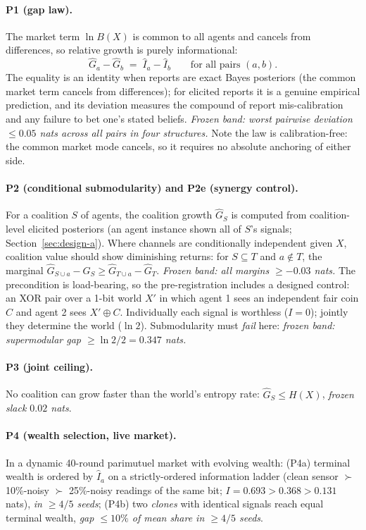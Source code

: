 \documentclass{article} %
\newcommand{\Ihat}{\hat{I}}
\newcommand{\Ghat}{\hat{G}}
\begin{document}
\paragraph{P1 (gap law).} The market term $\ln B(X)$ is common to all agents and cancels from differences, so relative growth is purely informational:
\begin{equation}
\Ghat_a - \Ghat_b \;=\; \Ihat_a - \Ihat_b \qquad \text{for all pairs } (a,b).
\label{eq:gaplaw}
\end{equation}
The equality is an identity when reports are exact Bayes posteriors (the common market term cancels from differences); for elicited reports it is a genuine empirical prediction, and its deviation measures the compound of report mis-calibration and any failure to bet one's stated beliefs. \emph{Frozen band: worst pairwise deviation $\leq 0.05$ nats across all pairs in four structures.} Note the law is calibration-free: the common market mode cancels, so it requires no absolute anchoring of either side.

\paragraph{P2 (conditional submodularity) and P2e (synergy control).} For a coalition $S$ of agents, the coalition growth $\Ghat_S$ is computed from coalition-level elicited posteriors (an agent instance shown all of $S$'s signals; Section~\ref{sec:design-a}). Where channels are conditionally independent given $X$, coalition value should show diminishing returns: for $S \subseteq T$ and $a \notin T$, the marginal $\Ghat_{S \cup a} - \Ghat_S \geq \Ghat_{T\cup a} - \Ghat_T$. \emph{Frozen band: all margins $\geq -0.03$ nats.} The precondition is load-bearing, so the pre-registration includes a designed control: an XOR pair over a 1-bit world $X'$ in which agent 1 sees an independent fair coin $C$ and agent 2 sees $X' \oplus C$. Individually each signal is worthless ($I = 0$); jointly they determine the world ($\ln 2$). Submodularity must \emph{fail} here: \emph{frozen band: supermodular gap $\geq \ln 2 / 2 = 0.347$ nats.}

\paragraph{P3 (joint ceiling).} No coalition can grow faster than the world's entropy rate: $\Ghat_S \leq H(X)$, \emph{frozen slack $0.02$ nats}.

\paragraph{P4 (wealth selection, live market).} In a dynamic 40-round parimutuel market with evolving wealth: (P4a) terminal wealth is ordered by $\Ihat_a$ on a strictly-ordered information ladder (clean sensor $\succ$ 10\%-noisy $\succ$ 25\%-noisy readings of the same bit; $I = 0.693 > 0.368 > 0.131$ nats), \emph{in $\geq 4/5$ seeds}; (P4b) two \emph{clones} with identical signals reach equal terminal wealth, \emph{gap $\leq 10\%$ of mean share in $\geq 4/5$ seeds}.
\end{document}
